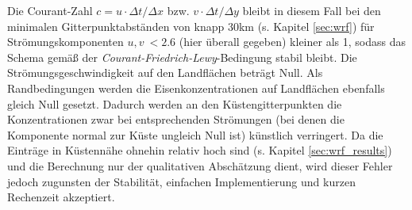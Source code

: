 \documentclass[12pt,a4paper,onecolumn]{scrartcl}
\begin{document}
Die Courant-Zahl $c = u \cdot \Delta t / \Delta x$ bzw. $v \cdot \Delta t / \Delta y$ bleibt in diesem Fall bei den minimalen Gitterpunktabständen von knapp 30km (s. Kapitel \ref{sec:wrf}) für Strömungskomponenten $u,v \ < 2.6$ (hier überall gegeben) kleiner als 1, sodass das Schema gemäß der \textit{Courant-Friedrich-Lewy}-Bedingung stabil bleibt. Die Strömungsgeschwindigkeit auf den Landflächen beträgt Null. Als Randbedingungen werden die Eisenkonzentrationen auf Landflächen ebenfalls gleich Null gesetzt. Dadurch werden an den Küstengitterpunkten die Konzentrationen zwar bei entsprechenden Strömungen (bei denen die Komponente normal zur Küste ungleich Null ist) künstlich verringert. Da die Einträge in Küstennähe ohnehin relativ hoch sind (s. Kapitel \ref{sec:wrf_results}) und die Berechnung nur der qualitativen Abschätzung dient, wird dieser Fehler jedoch zugunsten der Stabilität, einfachen Implementierung und kurzen Rechenzeit akzeptiert.
\end{document}
